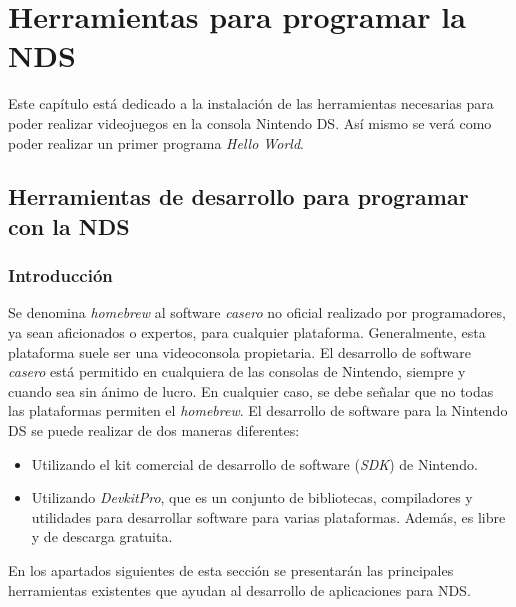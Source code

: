 \chapter{Herramientas para programar la NDS}

Este capítulo está dedicado a la instalación de las herramientas necesarias para poder realizar videojuegos en la consola Nintendo DS. Así mismo se verá como poder realizar un primer programa \textit{Hello World}.

\section{Herramientas de desarrollo para programar con la NDS}

\subsection{Introducción}
Se denomina \textit{homebrew} al software \textit{casero} no oficial realizado por programadores, ya sean aficionados o expertos, para cualquier plataforma. Generalmente, esta plataforma suele ser una videoconsola pro\-pie\-taria. El desarrollo de software \textit{casero} está permitido en cualquiera de las consolas de Nintendo, siempre y cuando sea sin ánimo de lucro. En cualquier caso, se debe señalar que no todas las plataformas permiten el \textit{homebrew}. El desarrollo de software para la Nintendo DS se puede realizar de dos maneras diferentes:

\begin{itemize}
\item Utilizando el kit comercial de desarrollo de software (\textit{SDK}) de Nintendo.
\item Utilizando \textit{DevkitPro}, que es un conjunto de bibliotecas, compiladores y utilidades para desarrollar software para varias plataformas. Además, es libre y de descarga gratuita.
\end{itemize}

En los apartados siguientes de esta sección se presentarán las principales herramientas existentes que ayudan al desarrollo de aplicaciones para NDS.

